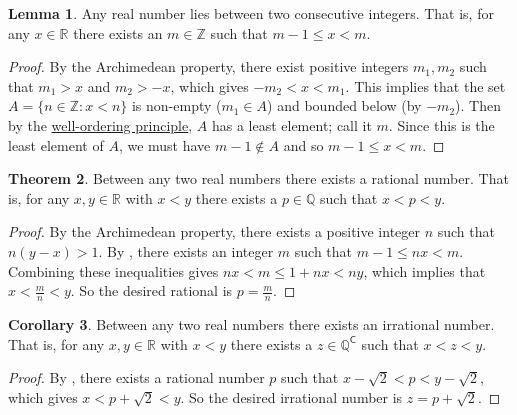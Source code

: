 \documentclass[12pt]{article}
\theoremstyle{definition}
\newtheorem{theorem}{Theorem}
\newtheorem{lemma}[theorem]{Lemma}
\newtheorem{corollary}[theorem]{Corollary}
\begin{document}
\begin{lemma}
\label{lem:real_number_lies_between_consecutive_integers}
    Any real number lies between two consecutive integers. That is, for any \( x \in \mathbb{R} \) there exists an \( m \in \mathbb{Z} \) such that \( m - 1 \leq x < m \).
\end{lemma}

\begin{proof}
    By the Archimedean property, there exist positive integers \( m_1, m_2 \) such that \( m_1 > x \) and \( m_2 > - x \), which gives \( -m_2 < x < m_1 \). This implies that the set \( A = \{ n \in \mathbb{Z} : x < n \} \) is non-empty (\( m_1 \in A \)) and bounded below (by \( -m_2 \)). Then by the \href{https://en.wikipedia.org/wiki/Well-ordering_principle}{well-ordering principle}, \( A \) has a least element; call it \( m \). Since this is the least element of \( A \), we must have \( m - 1 \not\in A \) and so \( m - 1 \leq x < m \).
\end{proof}

\begin{theorem}
\label{thm:density_of_Q_in_R}
    Between any two real numbers there exists a rational number. That is, for any \( x, y \in \mathbb{R} \) with \( x < y \) there exists a \( p \in \mathbb{Q} \) such that \( x < p < y \).
\end{theorem}

\begin{proof}
    By the Archimedean property, there exists a positive integer \( n \) such that \( n(y - x) > 1 \). By , there exists an integer \( m \) such that \( m - 1 \leq nx < m \). Combining these inequalities gives \( nx < m \leq 1 + nx < ny \), which implies that \( x < \frac{m}{n} < y \). So the desired rational is \( p = \frac{m}{n} \).
\end{proof}

\begin{corollary}
\label{cor:density_of_Qc_in_R}
    Between any two real numbers there exists an irrational number. That is, for any \( x, y \in \mathbb{R} \) with \( x < y \) there exists a \( z \in \mathbb{Q}^{\mathsf{C}} \) such that \( x < z < y \).
\end{corollary}

\begin{proof}
    By , there exists a rational number \( p \) such that \( x - \sqrt{2} < p < y - \sqrt{2} \), which gives \( x < p + \sqrt{2} < y \). So the desired irrational number is \( z = p + \sqrt{2} \).
\end{proof}
\end{document}
